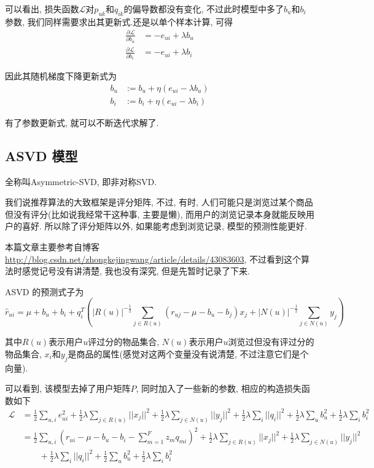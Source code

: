 \documentclass[a4paper,UTF8]{ctexart}
\theoremstyle{plain} \newtheorem{theorem}{定理}[section]
\theoremstyle{plain} \newtheorem{definition}{定义}[section]
\theoremstyle{plain} \newtheorem{lemma}{引理}[section]
\theoremstyle{plain} \newtheorem{proposition}{命题}[section]
\theoremstyle{plain} \newtheorem{example}{例}[section]
\theoremstyle{plain} \newtheorem{remark}{注}[section]
\theoremstyle{plain} \newtheorem{corollary}{推论}[section]
\newcommand{\p}[3]{\frac{\partial^{#1}#2}{\partial{#3}^{#1}}}  %
\begin{document}
可以看出, 损失函数$\mathcal{L}$对$p_{uk}$和$q_{ik}$的偏导数都没有变化, 不过此时模型中多了$b_u$和$b_i$参数, 我们同样需要求出其更新式.还是以单个样本计算, 可得
\begin{align*}
\p{}{\mathcal{L}}{b_u} & = - e_{ui} + \lambda b_{u} \\ 
\p{}{\mathcal{L}}{b_i} & = - e_{ui} + \lambda b_{i}
\end{align*}

因此其随机梯度下降更新式为
\begin{align*}
b_{u} & := b_{u} + \eta (e_{ui} - \lambda b_{u}) \\ 
b_{i} & := b_{i} + \eta (e_{ui} - \lambda b_{i})
\end{align*}

有了参数更新式, 就可以不断迭代求解了.


\subsection{ASVD 模型}
全称叫Asymmetric-SVD, 即非对称SVD.

我们说推荐算法的大致框架是评分矩阵, 不过, 有时, 人们可能只是浏览过某个商品但没有评分(比如说我经常干这种事, 主要是懒), 而用户的浏览记录本身就能反映用户的喜好. 所以除了评分矩阵以外, 如果能考虑到浏览记录, 模型的预测性能更好. 

本篇文章主要参考自博客\url{http://blog.csdn.net/zhongkejingwang/article/details/43083603}, 不过看到这个算法时感觉记号没有讲清楚, 我也没有深究, 但是先暂时记录了下来.

ASVD 的预测式子为
\begin{equation*}
\hat{r}_{ui} = \mu + b_{u} + b_{i} + q_{i}^{T} \left( |R(u)|^{-\frac{1}{2}} \sum_{j \in R(u)} (r_{uj} - \mu - b_{u} - b_{j}) x_{j} + |N(u)|^{-\frac{1}{2}} \sum_{j \in N(u)} y_{j} \right)
\end{equation*}

其中$R(u)$表示用户$u$评过分的物品集合, $N(u)$表示用户$u$浏览过但没有评过分的物品集合, $x_{i}$和$y_{j}$是商品的属性(感觉对这两个变量没有说清楚, 不过注意它们是个向量).

可以看到, 该模型去掉了用户矩阵$P$, 同时加入了一些新的参数, 相应的构造损失函数如下
\begin{align*}
\mathcal{L} & = \frac{1}{2} \sum_{u,i} e_{ui}^2 + \frac{1}{2} \lambda \sum_{j \in R(u)} ||x_{j}||^2 + \frac{1}{2} \lambda \sum_{j \in N(u)} ||y_{j}||^2 + \frac{1}{2} \lambda \sum_{i} ||q_i||^2 + \frac{1}{2} \lambda \sum_{u} b_{u}^2 + \frac{1}{2} \lambda \sum_{i} b_{i}^2 \\ 
& = \frac{1}{2} \sum_{u,i} \left( r_{ui} - \mu - b_{u} - b_{i} - \sum_{m=1}^{F} z_{m} q_{mi} \right)^2 + \frac{1}{2} \lambda \sum_{j \in R(u)} ||x_j||^2 + \frac{1}{2} \lambda \sum_{j \in N(u)} ||y_j||^2  \\ 
& \qquad + \frac{1}{2} \lambda \sum_{i} ||q_i||^2 + \frac{1}{2} \sum_{u} b_{u}^2 + \frac{1}{2} \lambda \sum_{i} b_{i}^2
\end{align*}
\end{document}
